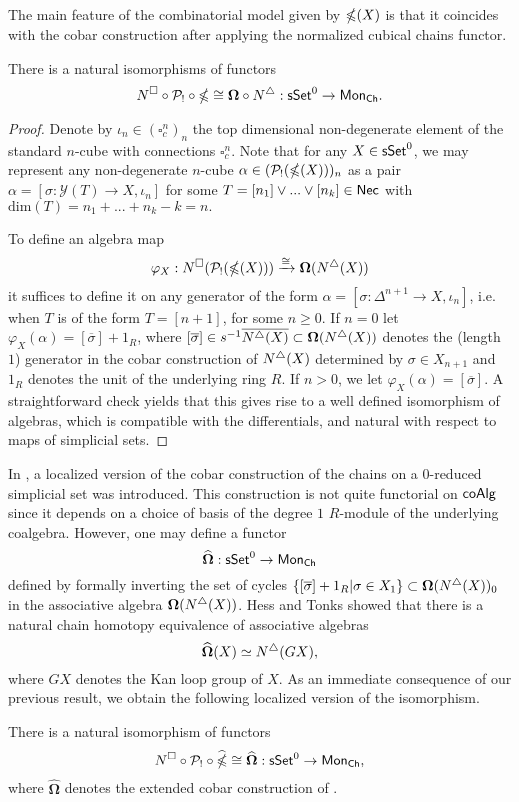 The main feature of the combinatorial model given by $\mathbb{\Omega}(X)$ is that it coincides with the cobar construction after applying the normalized cubical chains functor. 

\begin{proposition}
There is a natural isomorphisms of functors 
$$N^{\square} \circ \mathcal{P}_! \circ \mathbb{\Omega} \cong \mathbf{\Omega} \circ N^{\triangle}: \mathsf{sSet}^0 \to \mathsf{Mon}_{\mathsf{Ch}}.$$
\end{proposition}

\begin{proof} 
Denote by $\iota_n \in (\square^n_c)_n$ the top dimensional non-degenerate element of the standard $n$-cube with connections $\square^n_c$. Note that for any $X \in \mathsf{sSet}^0$, we may represent any non-degenerate $n$-cube $\alpha \in (\mathcal{P}_!(\mathbb{\Omega}(X)))_n$ as a pair $\alpha=[\sigma: \mathcal{Y}(T) \to X, \iota_n]$ for some $T=[n_1] \vee ... \vee [n_k] \in \mathsf{Nec}$ with $\text{dim}(T)=n_1+ ...+n_k-k=n.$

To define an algebra map
$$\varphi_X: N^{\square}(\mathcal{P}_!(\mathbb{\Omega}(X))) \xrightarrow{\cong} \mathbf{\Omega}(N^{\triangle}(X))$$
it suffices to define it on any generator of the form $\alpha=[\sigma \colon \Delta^{n+1} \to X, \iota_{n}]$, i.e. when $T$ is of the form $T=[n+1]$, for some $n\geq0$. If $n=0$ let $\varphi_X(\alpha)= [\overline{\sigma}]+ 1_R$, where $[\overline{\sigma}] \in s^{-1} \overline{ N^{\triangle}(X)} \subset \mathbf{\Omega}(N^{\triangle}(X))$ denotes the (length $1$) generator in the cobar construction of $N^{\triangle}(X)$ determined by $\sigma \in X_{n+1}$ and $1_R$ denotes the unit of the underlying ring $R$. If $n>0$, we let $\varphi_X(\alpha)=[\overline{\sigma}]$. A straightforward check yields that this gives rise to a well defined isomorphism of algebras, which is compatible with the differentials, and natural with respect to maps of simplicial sets.  
\end{proof}
In \cite{Hess and Tonks}, a localized version of the cobar construction of the chains on a $0$-reduced simplicial set was introduced. This construction is not quite functorial on $\mathsf{coAlg}$ since it depends on a choice of basis of the degree $1$ $R$-module of the underlying coalgebra. However, one may define a functor $$\widehat{\mathbf{\Omega}}: \mathsf{sSet}^0 \to \mathsf{Mon}_{\mathsf{Ch}}$$
defined by formally inverting the set of cycles $\{ [\overline{\sigma}]+1_R | \sigma \in X_1 \} \subset \mathbf{\Omega}(N^{\triangle}(X))_0$ in the associative algebra $\mathbf{\Omega}(N^{\triangle}(X))$. Hess and Tonks showed that there is a natural chain homotopy equivalence of associative algebras $$\widehat{\mathbf{\Omega}}(X)\simeq N^{\triangle}(GX),$$ where $GX$ denotes the Kan loop group of $X$. As an immediate consequence of our previous result, we obtain the following localized version of the isomorphism.

\begin{corollary}
There is a natural isomorphism of functors
$$N^{\square} \circ \mathcal{P}_! \circ \widehat{\mathbb{\Omega}} \cong \widehat{\mathbf{\Omega}} :\mathsf{sSet}^0 \to \mathsf{Mon}_{\mathsf{Ch}},$$ where $\widehat{\mathbf{\Omega}}$ denotes the extended cobar construction of \cite{Hess and Tonks}. 
\end{corollary}


